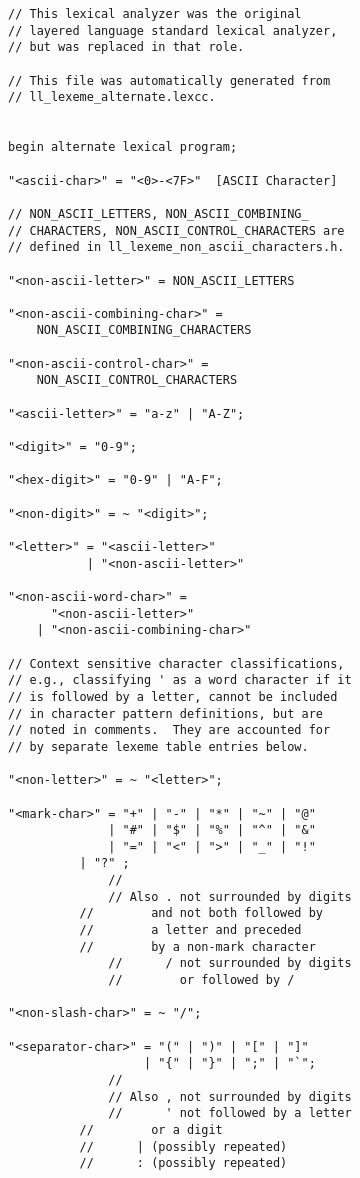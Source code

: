 \documentclass[12pt]{article}
\newenvironment{indpar}[1][0.3in]%
	{\begin{list}{}%
		     {\setlength{\itemsep}{0in}%
		      \setlength{\topsep}{0in}%
		      \setlength{\parsep}{1ex}%
		      \setlength{\labelwidth}{#1}%
		      \setlength{\leftmargin}{#1}%
		      \addtolength{\leftmargin}{\labelsep}}%
	 \item}%
	{\end{list}}
\begin{document}
\begin{indpar}
\begin{verbatim}
// This lexical analyzer was the original
// layered language standard lexical analyzer,
// but was replaced in that role.

// This file was automatically generated from
// ll_lexeme_alternate.lexcc.


begin alternate lexical program;

"<ascii-char>" = "<0>-<7F>"  [ASCII Character]

// NON_ASCII_LETTERS, NON_ASCII_COMBINING_
// CHARACTERS, NON_ASCII_CONTROL_CHARACTERS are
// defined in ll_lexeme_non_ascii_characters.h.

"<non-ascii-letter>" = NON_ASCII_LETTERS

"<non-ascii-combining-char>" =
    NON_ASCII_COMBINING_CHARACTERS

"<non-ascii-control-char>" =
    NON_ASCII_CONTROL_CHARACTERS

"<ascii-letter>" = "a-z" | "A-Z";

"<digit>" = "0-9";

"<hex-digit>" = "0-9" | "A-F";

"<non-digit>" = ~ "<digit>";

"<letter>" = "<ascii-letter>"
           | "<non-ascii-letter>"

"<non-ascii-word-char>" =
      "<non-ascii-letter>"
    | "<non-ascii-combining-char>"

// Context sensitive character classifications,
// e.g., classifying ' as a word character if it
// is followed by a letter, cannot be included
// in character pattern definitions, but are
// noted in comments.  They are accounted for
// by separate lexeme table entries below.

"<non-letter>" = ~ "<letter>";

"<mark-char>" = "+" | "-" | "*" | "~" | "@"
              | "#" | "$" | "%" | "^" | "&"
              | "=" | "<" | ">" | "_" | "!"
	      | "?" ;
              //
              // Also . not surrounded by digits
	      //        and not both followed by
	      //        a letter and preceded
	      //        by a non-mark character
              //      / not surrounded by digits
              //        or followed by /

"<non-slash-char>" = ~ "/";

"<separator-char>" = "(" | ")" | "[" | "]"
                   | "{" | "}" | ";" | "`";
              //
              // Also , not surrounded by digits
              //      ' not followed by a letter
	      //        or a digit
	      //      | (possibly repeated)
	      //      : (possibly repeated)


\end{verbatim}
\end{indpar}
\end{document}
